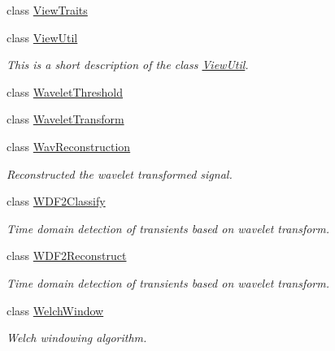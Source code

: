 \begin{DoxyCompactItemize}
class \hyperlink{classtsa_1_1_view_traits}{View\+Traits}
\item 
class \hyperlink{classtsa_1_1_view_util}{View\+Util}
\begin{DoxyCompactList}\small\item\em This is a short description of the class \hyperlink{classtsa_1_1_view_util}{View\+Util}. \end{DoxyCompactList}\item 
class \hyperlink{classtsa_1_1_wavelet_threshold}{Wavelet\+Threshold}
\item 
class \hyperlink{classtsa_1_1_wavelet_transform}{Wavelet\+Transform}
\item 
class \hyperlink{classtsa_1_1_wav_reconstruction}{Wav\+Reconstruction}
\begin{DoxyCompactList}\small\item\em Reconstructed the wavelet transformed signal. \end{DoxyCompactList}\item 
class \hyperlink{classtsa_1_1_w_d_f2_classify}{W\+D\+F2\+Classify}
\begin{DoxyCompactList}\small\item\em Time domain detection of transients based on wavelet transform. \end{DoxyCompactList}\item 
class \hyperlink{classtsa_1_1_w_d_f2_reconstruct}{W\+D\+F2\+Reconstruct}
\begin{DoxyCompactList}\small\item\em Time domain detection of transients based on wavelet transform. \end{DoxyCompactList}\item 
class \hyperlink{classtsa_1_1_welch_window}{Welch\+Window}
\begin{DoxyCompactList}\small\item\em Welch windowing algorithm. \end{DoxyCompactList}\end{DoxyCompactItemize}
